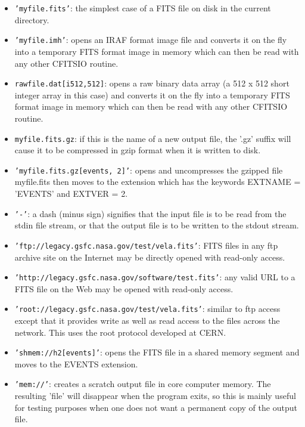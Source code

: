 \documentclass[11pt]{book}
\begin{document}
\begin{itemize}
\item
{\tt 'myfile.fits'}: the simplest case of a FITS file on disk in the current
directory.

\item
{\tt 'myfile.imh'}: opens an IRAF format image file and converts it on the
fly into a temporary FITS format image in memory which can then be read with
any other CFITSIO routine.

\item
{\tt rawfile.dat[i512,512]}: opens a raw binary data array (a 512 x 512
short integer array in this case) and converts it on the fly into a
temporary FITS format image in memory which can then be read with any
other CFITSIO routine.

\item
{\tt myfile.fits.gz}: if this is the name of a new output file, the '.gz'
suffix will cause it to be compressed in gzip format when it is written to
disk.

\item
{\tt 'myfile.fits.gz[events, 2]'}:  opens and uncompresses the gzipped file
myfile.fits then moves to the extension which has the keywords EXTNAME
= 'EVENTS' and EXTVER = 2.

\item
{\tt '-'}:  a dash (minus sign) signifies that the input file is to be read
from the stdin file stream, or that the output file is to be written to
the stdout stream.

\item
{\tt 'ftp://legacy.gsfc.nasa.gov/test/vela.fits'}:  FITS files in any ftp
archive site on the Internet may be directly opened with read-only
access.

\item
{\tt 'http://legacy.gsfc.nasa.gov/software/test.fits'}: any valid URL to a
FITS file on the Web may be opened with read-only access.

\item
{\tt 'root://legacy.gsfc.nasa.gov/test/vela.fits'}: similar to ftp access
except that it provides write as well as read access to the files
across the network. This uses the root protocol developed at CERN.

\item
{\tt 'shmem://h2[events]'}: opens the FITS file in a shared memory segment and
moves to the EVENTS extension.

\item
{\tt 'mem://'}:  creates a scratch output file in core computer memory.  The
resulting 'file' will disappear when the program exits, so this
is mainly useful for testing purposes when one does not want a
permanent copy of the output file.


\end{itemize}
\end{document}
